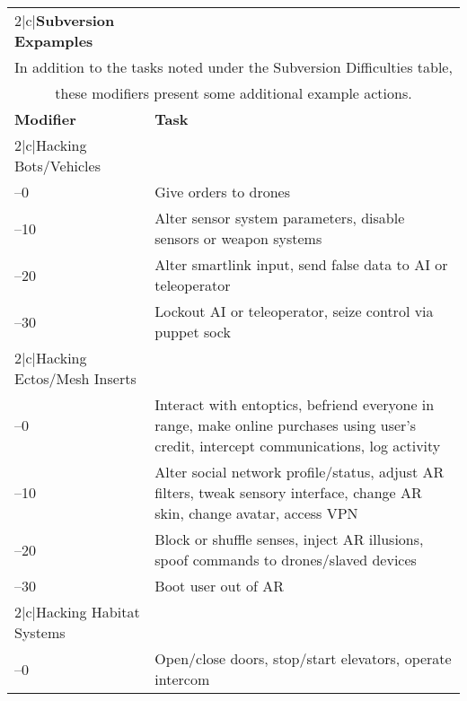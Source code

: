 \begin{table} 

\begin{tabularx}{\textwidth}{|l|X|} 

\hline

\hline{2}{|c|}{\textbf{Subversion Expamples}} \\ \multicolumn{2}{|c|}{In addition to the tasks noted under the Subversion Difficulties table,} \\ \multicolumn{2}{|c|}{these modifiers present some additional example actions.} \\ \hline

\textbf{Modifier} &\textbf{Task} \\ \hline

\hline{2}{|c|}{Hacking Bots/Vehicles} \\ \hline

–0 &Give orders to drones \\ \hline

–10 &Alter sensor system parameters, disable sensors or weapon systems \\ \hline

–20 &Alter smartlink input, send false data to AI or teleoperator \\ \hline

–30 &Lockout AI or teleoperator, seize control via puppet sock \\ \hline

\hline{2}{|c|}{Hacking Ectos/Mesh Inserts} \\ \hline

–0 &Interact with entoptics, befriend everyone in range, make online purchases using user's credit, intercept communications, log activity \\ \hline

–10 &Alter social network profile/status, adjust AR filters, tweak sensory interface, change AR skin, change avatar, access VPN \\ \hline

–20 &Block or shuffle senses, inject AR illusions, spoof commands to drones/slaved devices \\ \hline

–30 &Boot user out of AR \\ \hline

\hline{2}{|c|}{Hacking Habitat Systems} \\ \hline

–0 &Open/close doors, stop/start elevators, operate intercom \\ \hline


\end{tabularx}
\end{table}
